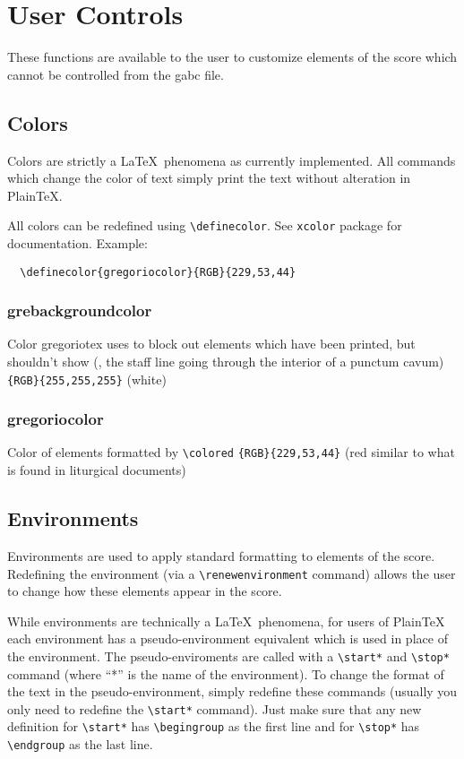 \section{User Controls}

These functions are available to the user to customize elements of the score which cannot be controlled from the gabc file.

\subsection{Colors}

Colors are strictly a \LaTeX\ phenomena as currently implemented.  All
commands which change the color of text simply print the text without
alteration in Plain\TeX.

All colors can be redefined using \verb=\definecolor=.  See
\verb=xcolor= package for documentation. Example:

\begin{verbatim}
  \definecolor{gregoriocolor}{RGB}{229,53,44}
\end{verbatim}


\subsubsection*{grebackgroundcolor}%
Color gregoriotex uses to block out elements which have been printed,
but shouldn't show (\eg, the staff line going through the interior of
a punctum cavum) \verb={RGB}{255,255,255}= (white)

\subsubsection*{gregoriocolor}
Color of elements formatted by \verb=\colored= \verb={RGB}{229,53,44}=
(red similar to what is found in liturgical documents)


\subsection{Environments}

Environments are used to apply standard formatting to elements of the
score.  Redefining the environment (via a \verb=\renewenvironment=
command) allows the user to change how these elements appear in the
score.

While environments are technically a \LaTeX\ phenomena, for users of
PlainTeX each environment has a pseudo-environment equivalent which is
used in place of the environment.  The pseudo-enviroments are called
with a \verb=\start*= and \verb=\stop*= command (where ``*'' is the
name of the environment).  To change the format of the text in the
pseudo-environment, simply redefine these commands (usually you only
need to redefine the \verb=\start*= command).  Just make sure that any
new definition for \verb=\start*= has \verb=\begingroup= as the first
line and for \verb=\stop*= has \verb=\endgroup= as the last line.

